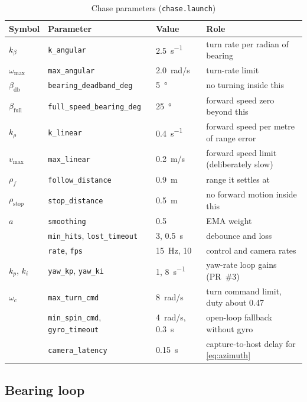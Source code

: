 \begin{table}[htbp]
\centering
\caption{Chase parameters (\texttt{chase.launch})}
\label{tab:chaseparams}
\small
\begin{tabular}{llll}
\toprule
Symbol & Parameter & Value & Role \\
\midrule
$k_\beta$ & \texttt{k\_angular} & \SI{2.5}{s^{-1}} & turn rate per radian of bearing \\
$\omega_{\max}$ & \texttt{max\_angular} & \SI{2.0}{rad/s} & turn-rate limit \\
$\beta_{\mathrm{db}}$ & \texttt{bearing\_deadband\_deg} & \SI{5}{\degree} & no turning inside this \\
$\beta_{\mathrm{full}}$ & \texttt{full\_speed\_bearing\_deg} & \SI{25}{\degree} & forward speed zero beyond this \\
$k_\rho$ & \texttt{k\_linear} & \SI{0.4}{s^{-1}} & forward speed per metre of range error \\
$v_{\max}$ & \texttt{max\_linear} & \SI{0.2}{m/s} & forward speed limit (deliberately slow) \\
$\rho_f$ & \texttt{follow\_distance} & \SI{0.9}{m} & range it settles at \\
$\rho_{\mathrm{stop}}$ & \texttt{stop\_distance} & \SI{0.5}{m} & no forward motion inside this \\
$a$ & \texttt{smoothing} & 0.5 & EMA weight \\
 & \texttt{min\_hits}, \texttt{lost\_timeout} & 3, \SI{0.5}{s} & debounce and loss \\
 & \texttt{rate}, \texttt{fps} & \SI{15}{Hz}, 10 & control and camera rates \\
$k_p$, $k_i$ & \texttt{yaw\_kp}, \texttt{yaw\_ki} & 1, \SI{8}{s^{-1}} & yaw-rate loop gains (PR~\#3) \\
$\omega_c$ & \texttt{max\_turn\_cmd} & \SI{8}{rad/s} & turn command limit, duty about 0.47 \\
 & \texttt{min\_spin\_cmd}, \texttt{gyro\_timeout} & \SI{4}{rad/s}, \SI{0.3}{s} & open-loop fallback without gyro \\
 & \texttt{camera\_latency} & \SI{0.15}{s} & capture-to-host delay for \eqref{eq:azimuth} \\
\bottomrule
\end{tabular}
\end{table}

\subsection{Bearing loop}

